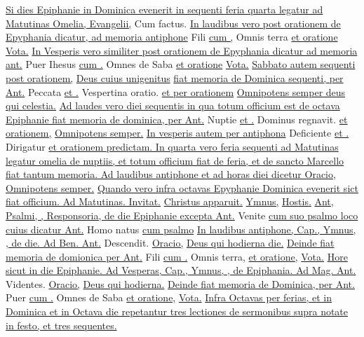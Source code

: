 \begin{multicols*}{2}
\newline \ul{Si dies Epiphanie in Dominica evenerit in sequenti feria quarta legatur ad Matutinas Omelia, Evangelii,} Cum factus. \ul{In laudibus vero post orationem de Epyphania dicatur, ad memoria antiphone} Fili \ul{cum \Vbar ,} Omnis terra \ul{et oratione} \hyperlink{vota-quesumus-epiphanie}{Vota.} \ul{In Vesperis vero similiter post orationem de Epyphania dicatur ad memoria ant.} Puer Ihesus \ul{cum \Vbar .} Omnes de Saba \ul{et oratione} \hyperlink{vota-quesumus-epiphanie}{Vota.} \ul{Sabbato autem sequenti post orationem,} \hyperlink{deus-cuius-unigenitus-epiphanie}{Deus cuius unigenitus} \ul{fiat memoria de Dominica sequenti, per Ant.} Peccata \ul{et \Vbar .} Vespertina oratio. \ul{et per orationem} \hyperlink{omnipotens-semper-deus-qui-dom-i-post}{Omnipotens semper deus qui celestia.} \ul{Ad laudes vero diei sequentis in qua totum officium est de octava Epiphanie fiat memoria de dominica, per Ant.} Nuptie \ul{et \Vbar .} Dominus regnavit. \ul{et orationem,} \hyperlink{omnipotens-semper-deus-qui-dom-i-post}{Omnipotens semper.} \ul{In vesperis autem per antiphona} Deficiente \ul{et \Vbar .} Dirigatur \ul{et orationem predictam. In quarta vero feria sequenti ad Matutinas legatur omelia de nuptiis, et totum officium fiat de feria, et de sancto Marcello fiat tantum memoria. Ad laudibus antiphone et ad horas diei dicetur Oracio,} \hyperlink{omnipotens-semper-deus-qui-dom-i-post}{Omnipotens semper.} \ul{Quando vero infra octavas Epyphanie Dominica evenerit sict fiat officium. Ad Matutinas. Invitat.} \hyperlink{christus-apparuit-invitatorium}{Christus apparuit.} \ul{Ymnus,} \hyperlink{hostis-herodes}{Hostis.} \ul{Ant, Psalmi, \Vbar , Responsoria, de die Epiphanie excepta Ant.} Venite \ul{cum suo psalmo loco cuius dicatur Ant.} Homo natus \ul{cum psalmo}  \ul{In laudibus antiphone, Cap., Ymnus, \Vbar , de die. Ad Ben. Ant.} Descendit. \ul{Oracio,} \hyperlink{deus-qui-hodierna-epiphanie}{Deus qui hodierna die.} \ul{Deinde fiat memoria de domionica per Ant.} Fili \ul{cum \Vbar .} Omnis terra, \ul{et oratione,} \hyperlink{vota-quesumus-epiphanie}{Vota.} \ul{Hore sicut in die Epiphanie. Ad Vesperas, Cap., Ymnus, \Vbar , de Epiphania. Ad Mag. Ant.} Videntes. \ul{Oracio,} \hyperlink{deus-qui-hodierna-epiphanie}{Deus qui hodierna.} \ul{Deinde fiat memoria de Dominica, per Ant.} Puer \ul{cum \Vbar .} Omnes de Saba \ul{et oratione,} \hyperlink{vota-quesumus-epiphanie}{Vota.} \ul{Infra Octavas per ferias, et in Dominica et in Octava die repetantur tres lectiones de sermonibus supra notate in festo, et tres sequentes.}

\end{multicols*}
